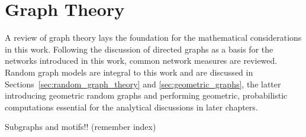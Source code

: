 \chapter{Graph Theory}\label{ch:Graph_theory} 

A review of graph theory lays the foundation for the mathematical
considerations in this work. Following the discussion of directed
graphs as a basis for the networks introduced in this work, common network
measures are reviewed. Random graph models are integral to this work and are
discussed in Sections~\ref{sec:random_graph_theory} and
\ref{sec:geometric_graphs}, the latter introducing geometric random
graphs and performing geometric, probabilistic computations essential
for the analytical discussions in later chapters. 











Subgraphs and motifs!! (remember index)












% 





